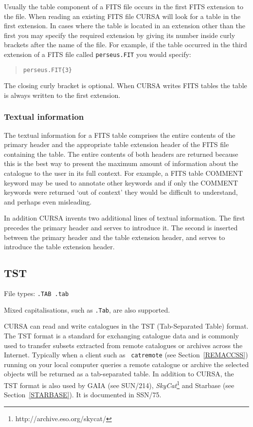 \documentclass[twoside,11pt]{article}
\newcommand{\htmladdnormallinkfoot}[2]{#1\footnote{#2}}
\newcommand{\xref}[3]{#1}
\renewcommand{\_}{\texttt{\symbol{95}}}
\begin{document}
Usually the table component of a FITS file occurs in the first FITS
extension to the file. When reading an existing FITS file CURSA will look
for a table in the first extension. In cases where the table is located
in an extension other than the first you may specify the required
extension by giving its number inside curly brackets after the name
of the file. For example, if the table occurred in the third extension
of a FITS file called {\tt perseus.FIT} you would specify:

\begin{verse}
{\tt perseus.FIT\{3\} }
\end{verse}

The closing curly bracket is optional. When CURSA writes FITS tables
the table is always written to the first extension.

\subsubsection{Textual information}

The textual information for a FITS table comprises the entire contents
of the primary header and the appropriate table extension header of the
FITS file containing the table. The entire contents of both headers are
returned because this is the best way to present the maximum amount of
information about the catalogue to the user in its full context. For
example, a FITS table COMMENT keyword may be used to annotate other
keywords and if only the COMMENT keywords were returned `out of context'
they would be difficult to understand, and perhaps even misleading.

In addition CURSA invents two additional lines of textual information.
The first precedes the primary header and serves to introduce it. The
second is inserted between the primary header and the table extension
header, and serves to introduce the table extension header.

\subsection{\label{TST}TST}

File types: {\tt .TAB  .tab}

Mixed capitalisations, such as {\tt .Tab}, are also supported.

CURSA can read and write catalogues in the TST (Tab-Separated Table)
format.  The TST format is a standard for exchanging catalogue data
and is commonly used to transfer subsets extracted from remote catalogues
or archives across the Internet.  Typically when a client such as {\tt
catremote} (see Section~\ref{REMACCSS}) running on your local computer
queries a remote catalogue or archive the selected objects will be returned
as a tab-separated table.  In addition to CURSA, the TST format is
also used by GAIA (see \xref{SUN/214}{sun214}{}\cite{SUN214}),
\htmladdnormallinkfoot{{\it SkyCat}\/}{http://archive.eso.org/skycat/}
and Starbase (see Section~\ref{STARBASE}).  It is documented in
\xref{SSN/75}{ssn75}{}\cite{SSN75}.
\end{document}
